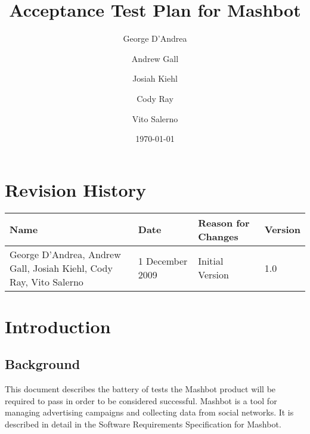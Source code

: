 \documentclass{article}
\begin{document}
\title{Acceptance Test Plan for Mashbot} 
\author{George D'Andrea \and Andrew Gall \and Josiah Kiehl \and
  Cody Ray \and Vito Salerno}
\date{\today}
\begin{titlepage}
\maketitle
\end{titlepage}

\section*{Revision History}
\begin{tabular}{|p{2in}|l|l|l|}
  \hline
  \textbf{Name} & \textbf{Date} & \textbf{Reason for Changes} & \textbf{Version} \\
  \hline \hline
  George D'Andrea, Andrew Gall, Josiah Kiehl, Cody Ray, Vito
  Salerno & 1 December 2009 & Initial Version & 1.0 \\
  \hline
\end{tabular}

\clearpage
\tableofcontents
\clearpage

\section{Introduction} %

\subsection{Background}

This document describes the battery of tests the Mashbot product will
be required to pass in order to be considered successful. Mashbot is a
tool for managing advertising campaigns and collecting data from
social networks. It is described in detail in the Software
Requirements Specification for Mashbot.
\end{document}
